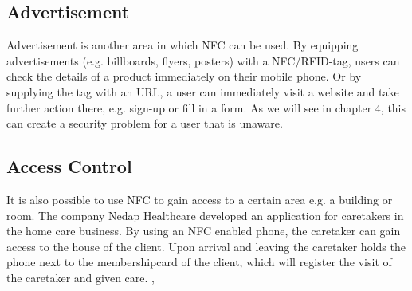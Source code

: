 \subsection{Advertisement}
Advertisement is another area in which NFC can be used. By equipping advertisements (e.g. billboards, flyers, posters) with a NFC/RFID-tag, users can check the details of a product immediately on their mobile phone. Or by supplying the tag with an URL, a user can immediately visit a website and take further action there, e.g. sign-up or fill in a form. As we will see in chapter 4, this can create a security problem for a user that is unaware. \cite{10.1109/ARES.2009.46}

\subsection{Access Control}
It is also possible to use NFC to gain access to a certain area e.g. a building or room. The company Nedap Healthcare developed an application for caretakers in the home care business. By using an NFC enabled phone, the caretaker can gain access to the house of the client. Upon arrival and leaving the caretaker holds the phone next to the membershipcard of the client, which will register the visit of the caretaker and given care. \cite{Nedap1}, \cite{Nedap2}



